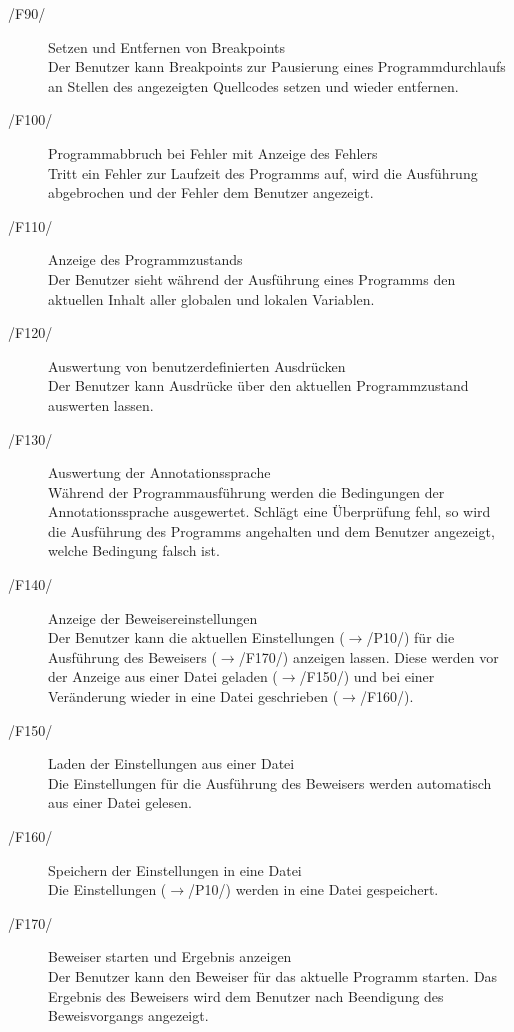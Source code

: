 \documentclass[a4paper,10pt]{article}
\begin{document}
\begin{description}
\begin{itemize}
\end{itemize}
\item[/F90/] Setzen und Entfernen von Breakpoints\\
Der Benutzer kann Breakpoints zur Pausierung eines Programmdurchlaufs an Stellen des angezeigten Quellcodes setzen und wieder entfernen.
\item[/F100/] Programmabbruch bei Fehler mit Anzeige des Fehlers\\
Tritt ein Fehler zur Laufzeit des Programms auf, wird die Ausführung abgebrochen und der Fehler dem Benutzer angezeigt.
\item[/F110/] Anzeige des Programmzustands\\
Der Benutzer sieht während der Ausführung eines Programms den aktuellen Inhalt aller globalen und lokalen Variablen.
\item[/F120/] Auswertung von benutzerdefinierten Ausdrücken\\
Der Benutzer kann Ausdrücke über den aktuellen Programmzustand auswerten lassen.
\item[/F130/] Auswertung der Annotationssprache\\
Während der Programmausführung werden die Bedingungen der Annotationssprache ausgewertet. Schlägt eine Überprüfung fehl, so wird die Ausführung des Programms angehalten und dem Benutzer angezeigt, welche Bedingung falsch ist.
\item[/F140/] Anzeige der Beweisereinstellungen\\
Der Benutzer kann die aktuellen Einstellungen ($\to$/P10/) für die Ausführung des Beweisers ($\to$/F170/) anzeigen lassen. Diese werden vor der Anzeige aus einer Datei geladen ($\to$/F150/) und bei einer Veränderung wieder in eine Datei geschrieben ($\to$/F160/).
\item[/F150/] Laden der Einstellungen aus einer Datei\\
Die Einstellungen für die Ausführung des Beweisers werden automatisch aus einer Datei gelesen.
\item[/F160/] Speichern der Einstellungen in eine Datei\\
Die Einstellungen ($\to$/P10/) werden in eine Datei gespeichert.
\item[/F170/] Beweiser starten und Ergebnis anzeigen\\
Der Benutzer kann den Beweiser für das aktuelle Programm starten. Das Ergebnis des Beweisers wird dem Benutzer nach Beendigung des Beweisvorgangs angezeigt.
\end{description}
\end{document}

